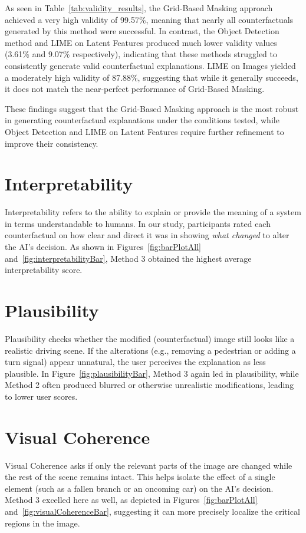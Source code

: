 As seen in Table~\ref{tab:validity_results}, the Grid-Based Masking approach achieved a very high validity of 99.57\%, meaning that nearly all counterfactuals generated by this method were successful. In contrast, the Object Detection method and LIME on Latent Features produced much lower validity values (3.61\% and 9.07\% respectively), indicating that these methods struggled to consistently generate valid counterfactual explanations. LIME on Images yielded a moderately high validity of 87.88\%, suggesting that while it generally succeeds, it does not match the near-perfect performance of Grid-Based Masking.

These findings suggest that the Grid-Based Masking approach is the most robust in generating counterfactual explanations under the conditions tested, while Object Detection and LIME on Latent Features require further refinement to improve their consistency.

\section{Interpretability}
\label{sec:interpretability}
Interpretability refers to the ability to explain or provide the meaning of a system in terms understandable to humans. In our study, 
participants rated each counterfactual on how clear and direct it was in showing \emph{what changed} to alter the AI's decision. 
As shown in Figures~\ref{fig:barPlotAll} and~\ref{fig:interpretabilityBar}, Method 3 obtained the highest average interpretability score.

\section{Plausibility}
\label{sec:plausibility}
Plausibility checks whether the modified (counterfactual) image still looks like a realistic driving scene. If the alterations 
(e.g., removing a pedestrian or adding a turn signal) appear unnatural, the user perceives the explanation as less plausible. 
In Figure~\ref{fig:plausibilityBar}, Method 3 again led in plausibility, while Method 2 often produced blurred or otherwise 
unrealistic modifications, leading to lower user scores.

\section{Visual Coherence}
\label{sec:visualcoherence}
Visual Coherence asks if only the relevant parts of the image are changed while the rest of the scene remains intact. 
This helps isolate the effect of a single element (such as a fallen branch or an oncoming car) on the AI's decision. 
Method 3 excelled here as well, as depicted in Figures~\ref{fig:barPlotAll} and~\ref{fig:visualCoherenceBar}, suggesting 
it can more precisely localize the critical regions in the image.

